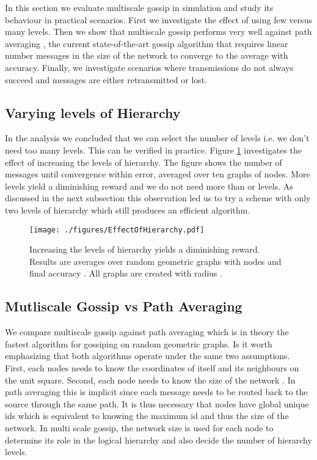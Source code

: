 In this section we evaluate multiscale gossip in simulation and study its behaviour in practical scenarios. First we investigate the effect of using few versus many levels. Then we show that multiscale gossip performs very well against path averaging \cite{benezit07}, the current state-of-the-art gossip algorithm that requires linear number messages in the size of the network to converge to the average with  accuracy. Finally, we investigate scenarios where transmissions do not always succeed and messages are either retransmitted or lost.

\subsection{Varying levels of Hierarchy}

In the analysis we concluded that we can select the number of levels  i.e. we don't need too many levels. This can be verified in practice. Figure \ref{fig:manylevels} investigates the effect of increasing the levels of hierarchy. The figure shows the number of messages until convergence within  error, averaged over ten graphs of   nodes. More levels yield a diminishing reward and we do not need more than  or  levels. As discussed in the next subsection this observation led us to try a scheme with only two levels of hierarchy which still produces an efficient algorithm. 

\begin{figure} 
\begin{center}
\texttt{[image: ./figures/EffectOfHierarchy.pdf]}
\caption{\label{fig:manylevels} Increasing the levels of hierarchy yields a diminishing reward. Results are averages over  random geometric graphs with  nodes and final accuracy . All graphs are created with radius .} 
\end{center}
\end{figure}



\subsection{Mutliscale Gossip vs Path Averaging}

We compare multiscale gossip against path averaging \cite{benezit07} which is in theory the fastest algorithm for gossiping on random geometric  graphs. Is it worth emphasizing that both algorithms operate under the same two assumptions. First, each nodes needs to know the coordinates of itself and its neighbours on the unit square. Second, each node needs to know the size of the network . In path averaging this is implicit since each message needs to be routed back to the source through the same path. It is thus necessary that nodes have global unique ids which is equivalent to knowing the maximum id and thus the size of the network. In multi scale gossip, the network size is used for each node to determine its role in the logical hierarchy and also decide the number of hierarchy levels.

